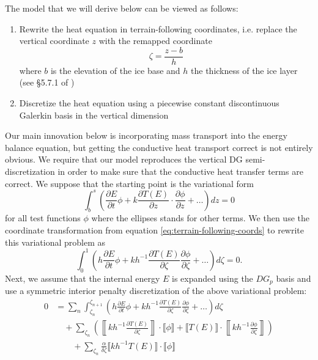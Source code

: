 \documentclass{article}
\theoremstyle{definition}
\theoremstyle{plain}
\begin{document}
The model that we will derive below can be viewed as follows:
\begin{enumerate}
    \item Rewrite the heat equation in terrain-following coordinates, i.e. replace the vertical coordinate $z$ with the remapped coordinate
        \begin{equation}
            \zeta = \frac{z - b}{h}
            \label{eq:terrain-following-coords}
        \end{equation}
        where $b$ is the elevation of the ice base and $h$ the thickness of the ice layer (see \S5.7.1 of \citet{greve2009dynamics})
    \item Discretize the heat equation using a piecewise constant discontinuous Galerkin basis in the vertical dimension
\end{enumerate}
Our main innovation below is incorporating mass transport into the energy balance equation, but getting the conductive heat transport correct is not entirely obvious.
We require that our model reproduces the vertical DG semi-discretization in order to make sure that the conductive heat transfer terms are correct.
We suppose that the starting point is the variational form
\begin{equation}
    \int_b^s\left(\frac{\partial E}{\partial t}\phi + k\frac{\partial T(E)}{\partial z}\cdot\frac{\partial\phi}{\partial z} + \ldots\right)dz = 0
\end{equation}
for all test functions $\phi$ where the ellipses stands for other terms.
We then use the coordinate transformation from equation \eqref{eq:terrain-following-coords} to rewrite this variational problem as
\begin{equation}
    \int_0^1\left(h\frac{\partial E}{\partial t}\phi + kh^{-1}\frac{\partial T(E)}{\partial\zeta}\frac{\partial\phi}{\partial\zeta} + \ldots\right)d\zeta = 0.
\end{equation}
Next, we assume that the internal energy $E$ is expanded using the $DG_p$ basis and use a symmetric interior penalty discretization of the above variational problem:
\begin{align}
    0 & = \sum_n\int_{\zeta_n}^{\zeta_{n + 1}}\left(h\frac{\partial E}{\partial t}\phi + kh^{-1}\frac{\partial T(E)}{\partial\zeta}\frac{\partial\phi}{\partial\zeta} + \ldots\right)d\zeta \nonumber\\
    & \quad + \sum_{\zeta_n}\left(\left\llbracket kh^{-1}\frac{\partial T(E)}{\partial\zeta}\right\rrbracket \cdot\llbracket\phi\rrbracket + \llbracket T(E)\rrbracket\cdot\left\llbracket kh^{-1}\frac{\partial\phi}{\partial\zeta}\right\rrbracket\right)\nonumber\\
    & \qquad + \sum_{\zeta_n}\frac{\alpha}{\delta\zeta}\llbracket kh^{-1}T(E)\rrbracket\cdot\llbracket\phi\rrbracket
\end{align}
\end{document}
